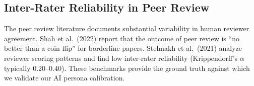 \subsection{Inter-Rater Reliability in Peer Review}

The peer review literature documents substantial variability in human reviewer agreement. Shah et al.\ (2022) report that the outcome of peer review is ``no better than a coin flip'' for borderline papers. Stelmakh et al.\ (2021) analyze reviewer scoring patterns and find low inter-rater reliability (Krippendorff's $\alpha$ typically $0.20$--$0.40$). These benchmarks provide the ground truth against which we validate our AI persona calibration.
